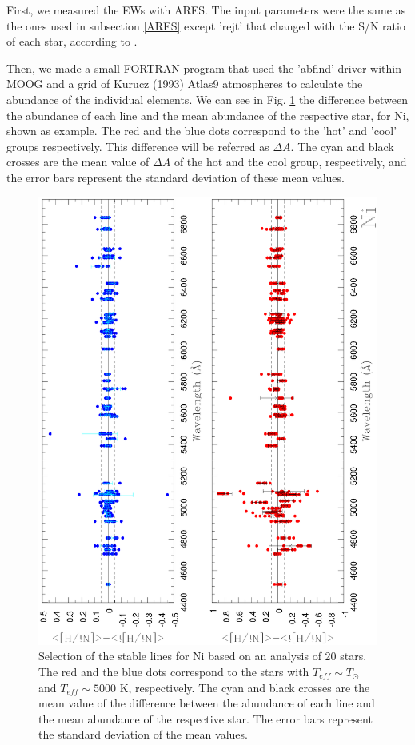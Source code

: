 \documentclass[dvips,12pt,a4paper]{report}
\begin{document}
{First, we measured the EWs with ARES. The input parameters were the same as the ones used in subsection \ref{ARES} except 'rejt' that changed with the S/N ratio of each star, according to \citet{Sousa-2008}. 

Then, we made a small FORTRAN program that used the 'abfind' driver within MOOG and a grid of Kurucz (1993) Atlas9 atmospheres to calculate the abundance of the individual elements. We can see in Fig. \ref{Ni20} the difference between the abundance of each line and the mean abundance of the respective star, for Ni, shown as example. The red and the blue dots correspond to the 'hot' and 'cool' groups respectively. This difference will be referred as $\Delta A$. The cyan and black crosses are the mean value of $\Delta A$ of the hot and the cool group, respectively, and the error bars represent the standard deviation of these mean values. 

\begin{figure}[h]
\centering
\includegraphics[height=13 cm, angle=-90]{pics/Ni20.eps}
\caption[20 star delta ab graphics]{Selection of the stable lines for Ni based on an analysis of 20 stars. The red and the blue dots correspond to the stars with $T_{eff}\sim T_\odot$ and $T_{eff}\sim 5000$ K, respectively. The cyan and black crosses are the mean value of the difference between the abundance of each line and the mean abundance of the respective star. The error bars represent the standard deviation of the mean values.}
\label{Ni20}
\end{figure}

}
\end{document}
